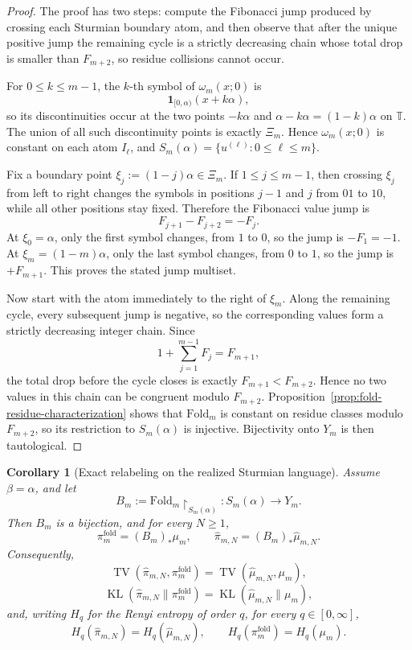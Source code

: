\documentclass[11pt,letterpaper]{article}
\numberwithin{equation}{section}
\theoremstyle{plain}
\newtheorem{corollary}[theorem]{Corollary}
\theoremstyle{definition}
\theoremstyle{remark}
\newcommand{\TT}{\mathbb{T}}
\newcommand{\Fold}{\mathrm{Fold}}
\DeclareMathOperator{\TV}{TV}
\DeclareMathOperator{\KL}{KL}
\begin{document}
\begin{proof}
The proof has two steps: compute the Fibonacci jump produced by crossing each
Sturmian boundary atom, and then observe that after the unique positive jump
the remaining cycle is a strictly decreasing chain whose total drop is smaller
than \(F_{m+2}\), so residue collisions cannot occur.

For \(0\le k\le m-1\), the \(k\)-th symbol of \(\omega_m(x;0)\) is
\[
\mathbf{1}_{[0,\alpha)}(x+k\alpha),
\]
so its discontinuities occur at the two points \(-k\alpha\) and
\(\alpha-k\alpha=(1-k)\alpha\) on \(\TT\). The union of all such discontinuity
points is exactly \(\Xi_m\). Hence \(\omega_m(x;0)\) is constant on each atom
\(I_\ell\), and \(S_m(\alpha)=\{u^{(\ell)}:0\le \ell\le m\}\).

Fix a boundary point \(\xi_j:=(1-j)\alpha\in\Xi_m\).
If \(1\le j\le m-1\), then crossing \(\xi_j\) from left to right changes the
symbols in positions \(j-1\) and \(j\) from \(01\) to \(10\), while all other
positions stay fixed. Therefore the Fibonacci value jump is
\[
F_{j+1}-F_{j+2}=-F_j.
\]
At \(\xi_0=\alpha\), only the first symbol changes, from \(1\) to \(0\), so
the jump is \(-F_1=-1\). At \(\xi_m=(1-m)\alpha\), only the last symbol
changes, from \(0\) to \(1\), so the jump is \(+F_{m+1}\). This proves the
stated jump multiset.

Now start with the atom immediately to the right of \(\xi_m\). Along the
remaining cycle, every subsequent jump is negative, so the corresponding values
form a strictly decreasing integer chain. Since
\[
1+\sum_{j=1}^{m-1}F_j=F_{m+1},
\]
the total drop before the cycle closes is exactly \(F_{m+1}<F_{m+2}\). Hence
no two values in this chain can be congruent modulo \(F_{m+2}\).
Proposition~\ref{prop:fold-residue-characterization} shows that
\(\Fold_m\) is constant on residue classes modulo \(F_{m+2}\), so its
restriction to \(S_m(\alpha)\) is injective. Bijectivity onto \(Y_m\) is then
tautological.
\end{proof}

\begin{corollary}[Exact relabeling on the realized Sturmian language]\label{cor:sturmian-exact-relabeling}
Assume \(\beta=\alpha\), and let
\[
B_m:=\Fold_m\!\upharpoonright_{S_m(\alpha)}:S_m(\alpha)\to Y_m.
\]
Then \(B_m\) is a bijection, and for every \(N\ge 1\),
\[
\pi_m^{\mathrm{fold}}=(B_m)_*\mu_m,
\qquad
\hat\pi_{m,N}=(B_m)_*\hat\mu_{m,N}.
\]
Consequently,
\[
\TV(\hat\pi_{m,N},\pi_m^{\mathrm{fold}})
=
\TV(\hat\mu_{m,N},\mu_m),
\]
\[
\KL(\hat\pi_{m,N}\|\pi_m^{\mathrm{fold}})
=
\KL(\hat\mu_{m,N}\|\mu_m),
\]
and, writing \(H_q\) for the Renyi entropy of order \(q\), for every
\(q\in[0,\infty]\),
\[
H_q(\hat\pi_{m,N})=H_q(\hat\mu_{m,N}),
\qquad
H_q(\pi_m^{\mathrm{fold}})=H_q(\mu_m).
\]
\end{corollary}
\end{document}
